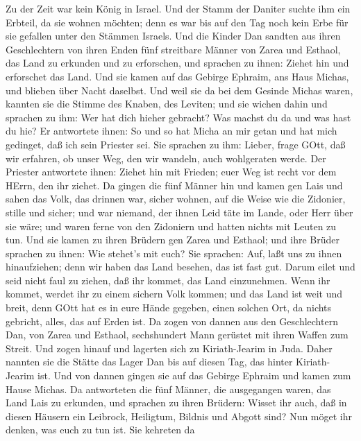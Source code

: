  Zu der Zeit war kein König in Israel. Und der Stamm der
Daniter suchte ihm ein Erbteil, da sie wohnen möchten; denn es war bis
auf den Tag noch kein Erbe für sie gefallen unter den Stämmen Israels.
 Und die Kinder Dan sandten aus ihren Geschlechtern von
ihren Enden fünf streitbare Männer von Zarea und Esthaol, das Land zu
erkunden und zu erforschen, und sprachen zu ihnen: Ziehet hin und
erforschet das Land. Und sie kamen auf das Gebirge Ephraim, ans Haus
Michas, und blieben über Nacht daselbst.  Und weil sie da
bei dem Gesinde Michas waren, kannten sie die Stimme des Knaben, des
Leviten; und sie wichen dahin und sprachen zu ihm: Wer hat dich hieher
gebracht? Was machst du da und was hast du hie?  Er
antwortete ihnen: So und so hat Micha an mir getan und hat mich
gedinget, daß ich sein Priester sei.  Sie sprachen zu ihm:
Lieber, frage GOtt, daß wir erfahren, ob unser Weg, den wir wandeln,
auch wohlgeraten werde.  Der Priester antwortete ihnen:
Ziehet hin mit Frieden; euer Weg ist recht vor dem HErrn, den ihr
ziehet.  Da gingen die fünf Männer hin und kamen gen Lais
und sahen das Volk, das drinnen war, sicher wohnen, auf die Weise wie
die Zidonier, stille und sicher; und war niemand, der ihnen Leid täte im
Lande, oder Herr über sie wäre; und waren ferne von den Zidoniern und
hatten nichts mit Leuten zu tun.  Und sie kamen zu ihren
Brüdern gen Zarea und Esthaol; und ihre Brüder sprachen zu ihnen: Wie
stehet's mit euch?  Sie sprachen: Auf, laßt uns zu ihnen
hinaufziehen; denn wir haben das Land besehen, das ist fast gut. Darum
eilet und seid nicht faul zu ziehen, daß ihr kommet, das Land
einzunehmen.  Wenn ihr kommet, werdet ihr zu einem sichern
Volk kommen; und das Land ist weit und breit, denn GOtt hat es in eure
Hände gegeben, einen solchen Ort, da nichts gebricht, alles, das auf
Erden ist.  Da zogen von dannen aus den Geschlechtern Dan,
von Zarea und Esthaol, sechshundert Mann gerüstet mit ihren Waffen zum
Streit.  Und zogen hinauf und lagerten sich zu
Kiriath-Jearim in Juda. Daher nannten sie die Stätte das Lager Dan bis
auf diesen Tag, das hinter Kiriath-Jearim ist.  Und von
dannen gingen sie auf das Gebirge Ephraim und kamen zum Hause Michas.
 Da antworteten die fünf Männer, die ausgegangen waren, das
Land Lais zu erkunden, und sprachen zu ihren Brüdern: Wisset ihr auch,
daß in diesen Häusern ein Leibrock, Heiligtum, Bildnis und Abgott sind?
Nun möget ihr denken, was euch zu tun ist.  Sie kehreten da
